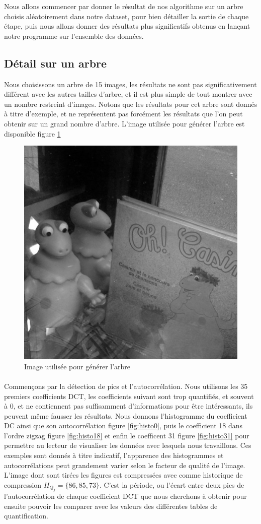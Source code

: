 \documentclass[utf8,final]{stageM2R} %
\begin{document}
Nous allons commencer par donner le résultat de nos algorithme sur un arbre choisis aléatoirement dans notre dataset, pour bien détailler la sortie de chaque étape, puis nous allons donner des résultats plus significatifs obtenus en lançant notre programme sur l'ensemble des données.

\subsection{Détail sur un arbre}
Nous choisissons un arbre de 15 images, les résultats ne sont pas significativement différent avec les autres tailles d'arbre, et il est plus simple de tout montrer avec un nombre restreint d'images. Notons que les résultats pour cet arbre sont donnés à titre d'exemple, et ne représentent pas forcément les résultats que l'on peut obtenir sur un grand nombre d'arbre. L'image utilisée pour générer l'arbre est disponible figure \ref{casimir}

\begin{figure}
\centering
\includegraphics[width=0.5\linewidth]{images/casimir}
\caption{Image utilisée pour générer l'arbre}
\label{casimir}
\end{figure}

\paragraph{}
Commençons par la détection de pics et l'autocorrélation. Nous utilisons les 35 premiers coefficients DCT, les coefficients suivant sont trop quantifiés, et souvent à 0, et ne contiennent pas suffisamment d'informations pour être intéressants, ils peuvent même fausser les résultats. Nous donnons l'histogramme du coefficient DC ainsi que son autocorrélation figure \ref{fig:histo0}, puis le coefficient 18 dans l'ordre zigzag figure \ref{fig:histo18} et enfin le coefficent 31 figure \ref{fig:histo31} pour permettre au lecteur de visualiser les données avec lesquels nous travaillons. Ces exemples sont donnés à titre indicatif, l'apparence des histogrammes et autocorrélations peut grandement varier selon le facteur de qualité de l'image. L'image dont sont tirées les figures est compressées avec comme historique de compression $H_{Q_{f}} = \{86, 85, 73\}$. C'est la période, ou l'écart entre deux pics de l'autocorrélation de chaque coefficient DCT que nous cherchons à obtenir pour ensuite pouvoir les comparer avec les valeurs des différentes tables de quantification.
\end{document}
